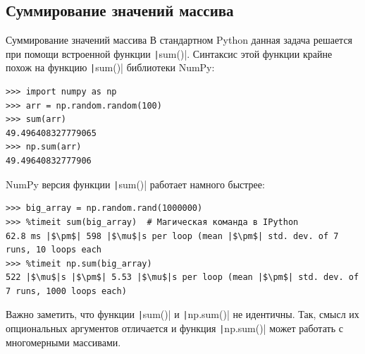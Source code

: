 \documentclass[aspectratio=169, mathserif]{beamer}%
\begin{document}
\subsection{Суммирование значений массива}
\begin{frame}[fragile]{Суммирование значений массива}
\scriptsize
В стандартном Python данная задача решается при помощи встроенной функции \texttt|sum()|. Синтаксис этой функции крайне похож на функцию \texttt|sum()| библиотеки NumPy:

\begin{verbatim}
>>> import numpy as np
>>> arr = np.random.random(100)
>>> sum(arr)
49.496408327779065
>>> np.sum(arr)
49.49640832777906
\end{verbatim}

NumPy версия функции \texttt|sum()| работает намного быстрее:

\begin{verbatim}
>>> big_array = np.random.rand(1000000)
>>> %timeit sum(big_array)  # Магическая команда в IPython
62.8 ms |$\pm$| 598 |$\mu$|s per loop (mean |$\pm$| std. dev. of 7 runs, 10 loops each
>>> %timeit np.sum(big_array)
522 |$\mu$|s |$\pm$| 5.53 |$\mu$|s per loop (mean |$\pm$| std. dev. of 7 runs, 1000 loops each)
\end{verbatim}

Важно заметить, что функции \texttt|sum()| и \texttt|np.sum()| не идентичны. Так, смысл их опциональных аргументов отличается и функция \texttt|np.sum()| может работать с многомерными массивами.
\vfill
\end{frame}
\end{document}
